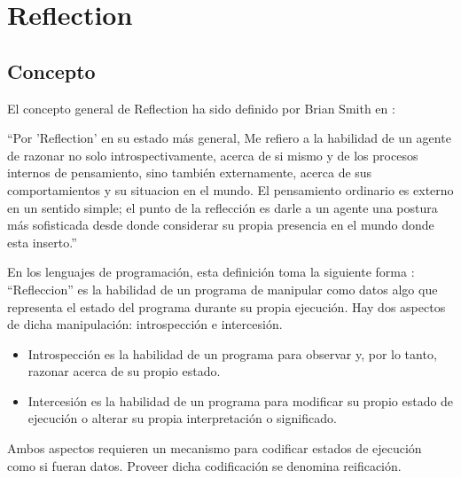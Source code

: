 \section{Reflection}
\label{sec:reflection}
\subsection{Concepto}

El concepto general de Reflection ha sido definido por Brian Smith en
\cite{Smith84}:

``Por 'Reflection' en su estado más general, Me refiero a la habilidad de un
agente de razonar no solo introspectivamente, acerca de si mismo y de los
procesos internos de pensamiento, sino también externamente, acerca de sus
comportamientos y su situacion en el mundo. El pensamiento ordinario es externo
en un sentido simple; el punto de la reflección es darle a un agente una postura
más sofisticada desde donde considerar su propia presencia en el mundo donde
esta inserto.''

En los lenguajes de programación, esta definición toma la siguiente forma
\cite{BGW93}:
``Refleccion'' es la habilidad de un programa de manipular como datos algo que
representa el estado del programa durante su propia ejecución. Hay dos aspectos
de dicha manipulación: introspección e intercesión.
\begin{itemize}
  \item Introspección es la habilidad de un programa para observar y, por lo
tanto, razonar acerca de su propio estado.
  \item Intercesión es la habilidad de un programa para modificar su propio
  estado de ejecución o alterar su propia interpretación o significado.
\end{itemize}

Ambos aspectos requieren un mecanismo para codificar estados de ejecución como
si fueran datos. Proveer dicha codificación se denomina reificación.
